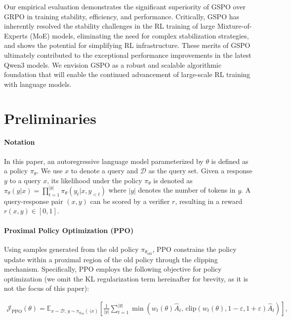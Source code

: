 Our empirical evaluation demonstrates the significant superiority of GSPO over GRPO in training stability, efficiency, and performance. Critically, GSPO has inherently resolved the stability challenges in the RL training of large Mixture-of-Experts (MoE) models, eliminating the need for complex stabilization strategies, and shows the potential for simplifying RL infrastructure. These merits of GSPO ultimately contributed to the exceptional performance improvements in the latest Qwen3 models. We envision GSPO as a robust and scalable algorithmic foundation that will enable the continued advancement of large-scale RL training with language models.

\section{Preliminaries}

\paragraph{Notation}
In this paper, an autoregressive language model parameterized by $\theta$ is defined as a policy $\pi_\theta$.
We use $x$ to denote a query and $\mathcal{D}$ as the query set. Given a response $y$ to a query $x$, its likelihood under the policy $\pi_\theta$ is denoted as $\pi_\theta (y | x)=\prod_{t=1}^{|y|} \pi_\theta (y_t | x, y_{<t} )$ where $|y|$ denotes the number of tokens in $y$. A query-response pair $(x, y)$ can be scored by a verifier $r$, resulting in a reward $r(x, y) \in [ 0, 1 ]$.

\paragraph{Proximal Policy Optimization (PPO)} Using samples generated from the old policy $\pi_{\theta_\text{old}}$, PPO \citep{ppo} constrains the policy update within a proximal region of the old policy through the clipping mechanism. Specifically, PPO employs the following objective for policy optimization (we omit the KL regularization term hereinafter for brevity, as it is not the focus of this paper):

\begin{align}
\mathcal{J}_\text{PPO}(\theta) = \mathbb{E}_{ x \sim \mathcal{D},\, y \sim \pi_{\theta_\text{old}}( \cdot | x) }
\left[ \frac{1}{|y|} \sum_{t=1}^{|y|} 
\min \left( w_{t}(\theta) \widehat{A}_{t},  \, \mathrm{clip} \left( w_{t}(\theta), 1 - {\varepsilon}, 1 + {\varepsilon}\right) \widehat{A}_{t} \right)
\right],
\end{align}

